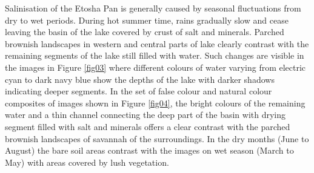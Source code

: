 \documentclass[climate,article,submit,pdftex,moreauthors]{Definitions/mdpi}
\begin{document}
{Salinisation of the Etosha Pan is generally caused by seasonal fluctuations from dry to wet periods. During hot summer time, rains gradually slow and cease leaving the basin of the lake covered by crust of salt and minerals}. Parched brownish landscapes in western and central parts of lake clearly contrast with the remaining segments of the lake still filled with water. Such changes are visible in the images in Figure \ref{fig03} where different colours of water varying from electric cyan to dark navy blue show the depths of the lake with darker shadows indicating deeper segments. In the set of false colour and natural colour composites of images shown in Figure \ref{fig04}, the bright colours of the remaining water and a thin channel connecting the deep part of the basin with drying segment filled with salt and minerals offers a clear contrast with the parched brownish landscapes of savannah of the surroundings. In the dry months (June to August) the bare soil areas contrast with the images on wet season (March to May) with areas covered by lush vegetation. 
\end{document}
